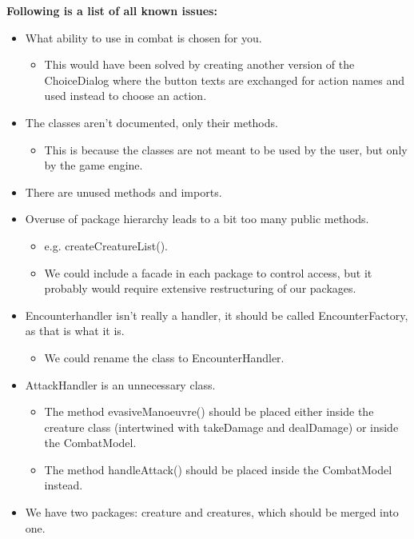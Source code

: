 \textbf{Following is a list of all known issues:}
\begin{itemize}[$\circ$]
	\item What ability to use in combat is chosen for you.
	      \begin{itemize}[$-$]
		      \item This would have been solved by creating another version of the ChoiceDialog where the button texts are exchanged for action names and used instead to choose an action.
	      \end{itemize}
	\item The classes aren't documented, only their methods.
	      \begin{itemize}[$-$]
		      \item This is because the classes are not meant to be used by the user, but only by the game engine.
	      \end{itemize}
	\item There are unused methods and imports.
	\item Overuse of package hierarchy leads to a bit too many public methods.
	      \begin{itemize}[$-$]
		      \item e.g. createCreatureList().
		      \item We could include a facade in each package to control access, but it probably would require extensive restructuring of our packages.
	      \end{itemize}
	\item Encounterhandler isn't really a handler, it should be called EncounterFactory, as that is what it is.
	      \begin{itemize}[$-$]
		      \item We could rename the class to EncounterHandler.
	      \end{itemize}
	\item AttackHandler is an unnecessary class.
	      \begin{itemize}[$-$]
		      \item The method evasiveManoeuvre() should be placed either inside the creature class (intertwined with takeDamage and dealDamage) or inside the CombatModel.
		      \item The method handleAttack() should be placed inside the CombatModel instead.
	      \end{itemize}
	\item We have two packages: creature and creatures, which should be merged into one.
	      \begin{itemize}[$-$]

\end{itemize}
\end{itemize}

